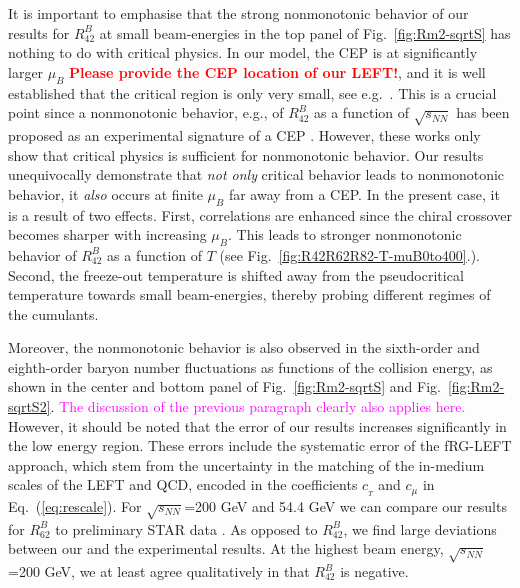 \documentclass[%
reprint,
superscriptaddress,
showpacs,preprintnumbers,
amsmath,amssymb,
aps,
prd,
]{revtex4-1}
\def\Fig#1{Fig.~\ref{#1}} \def\Tab#1{Tab.~\ref{#1}}
\def\Eq#1{Eq.~(\ref{#1})}
\newcommand{\coljan}[1]{\textcolor{red}{#1}}
\newcommand{\colfab}[1]{\textcolor{magenta}{#1}}
\begin{document}
It is important to emphasise that the strong nonmonotonic behavior of our results for $R^{B}_{42}$ at small  beam-energies in the top panel of \Fig{fig:Rm2-sqrtS} has nothing to do with critical physics. In our model, the CEP is at significantly larger $\mu_B$ \coljan{ \bf Please provide the CEP location of our LEFT!}, and it is well established that the critical region is only very small, see e.g.\ \cite{Schaefer:2006ds}. This is a crucial point since a nonmonotonic behavior, e.g., of $R^{B}_{42}$ as a function of $\sqrt{s_{NN}}$ has been proposed as an experimental signature of a CEP \cite{Stephanov:1999zu, Stephanov:2011pb}. However, these works only show that critical physics is sufficient for nonmonotonic behavior. Our results unequivocally demonstrate that \emph{not only} critical behavior  leads to nonmonotonic behavior, it \emph{also} occurs at finite $\mu_B$ far away from a CEP. In the present case, it is a result of two effects. First, correlations are enhanced since the chiral crossover becomes sharper with increasing $\mu_B$. This leads to stronger nonmonotonic behavior of $R^{B}_{42}$ as a function of $T$ (see \Fig{fig:R42R62R82-T-muB0to400}.). Second, the freeze-out temperature is shifted away from the pseudocritical temperature towards small beam-energies, thereby probing different regimes of the cumulants.
	
	
Moreover, the nonmonotonic behavior is also observed in the sixth-order and eighth-order baryon number fluctuations as functions of the collision energy, as shown in the center and bottom panel of \Fig{fig:Rm2-sqrtS} and \Fig{fig:Rm2-sqrtS2}. 
\colfab{The discussion of the previous paragraph clearly also applies here.}
However, it should be noted that the error of our results increases significantly in the low energy region. These errors include the systematic error of the fRG-LEFT approach, which stem from the uncertainty in the matching of the in-medium scales of the LEFT and QCD, encoded in the coefficients $c_{_{T}}$ and $c_{\mu}$ in \Eq{eq:rescale}.
For $\sqrt{s_{NN}}$=200 GeV and 54.4 GeV we can compare our results for $R^{B}_{62}$ to preliminary STAR data \cite{Nonaka:2020crv,Pandav:2020uzx}. As opposed to $R^{B}_{42}$, we find large deviations between our and the experimental results. At the highest beam energy, $\sqrt{s_{NN}}$=200 GeV, we at least agree qualitatively in that $R^{B}_{42}$ is negative.
	
	
	
	
	
	
\end{document}
